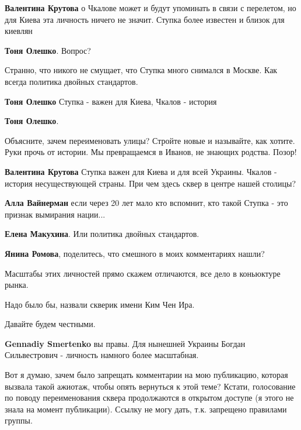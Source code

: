 \begin{itemize}
\begin{itemize}
\begin{itemize}
\textbf{Валентина Крутова} о Чкалове может и будут упоминать в связи с перелетом, но для Киева эта личность ничего не значит. Ступка более известен и близок для киевлян

\textbf{Тоня Олешко}. Вопрос?

Странно, что никого не смущает, что Ступка много снимался в Москве. Как всегда политика двойных стандартов.

\textbf{Тоня Олешко} Ступка - важен для Киева, Чкалов - история

\textbf{Тоня Олешко}. 

Объясните, зачем переименовать улицы? Стройте новые и называйте, как хотите.
Руки прочь от истории. Мы превращаемся в Иванов, не знающих родства. Позор!

\textbf{Валентина Крутова} Ступка важен для Киева и для всей Украины. Чкалов - история несуществующей страны. При чем здесь сквер в центре нашей столицы?
\end{itemize} %

\textbf{Алла Вайнерман} если через 20 лет мало кто вспомнит, кто такой Ступка - это признак вымирания нации...

\textbf{Елена Макухина}. Или политика двойных стандартов.

\textbf{Янина Ромова}, поделитесь, что смешного в моих комментариях нашли?


Масштабы этих личностей прямо скажем отличаются, все дело в коньюктуре рынка.

Надо было бы, назвали скверик имени Ким Чен Ира.

Давайте будем честными.

\begin{itemize} %
\textbf{Gennadiy Smertenko} вы правы. Для нынешней Украины Богдан Сильвестрович - личность намного более масштабная.
\end{itemize} %

\end{itemize} %


Вот я думаю, зачем было запрещать комментарии на мою публикацию, которая
вызвала такой ажиотаж, чтобы опять вернуться к этой теме? Кстати, голосование
по поводу переименования сквера продолжаются в открытом доступе (я этого не
знала на момент публикации). Ссылку не могу дать, т.к. запрещено правилами
группы.


\end{itemize}
